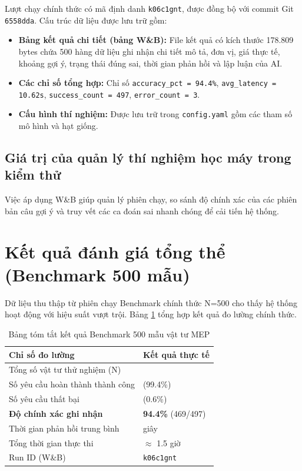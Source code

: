 Lượt chạy chính thức có mã định danh \texttt{k06c1gnt}, được đồng bộ với commit Git \texttt{6558dda}. Cấu trúc dữ liệu được lưu trữ gồm:

\begin{itemize}
    \item \textbf{Bảng kết quả chi tiết (bảng W\&B):} File kết quả có kích thước 178.809 bytes chứa 500 hàng dữ liệu ghi nhận chi tiết mô tả, đơn vị, giá thực tế, khoảng gợi ý, trạng thái đúng sai, thời gian phản hồi và lập luận của AI.
    \item \textbf{Các chỉ số tổng hợp:} Chỉ số \texttt{accuracy\_pct = 94.4\%}, \texttt{avg\_latency = 10.62s}, \texttt{success\_count = 497}, \texttt{error\_count = 3}.
    \item \textbf{Cấu hình thí nghiệm:} Được lưu trữ trong \texttt{config.yaml} gồm các tham số mô hình và hạt giống.
\end{itemize}

\subsection{Giá trị của quản lý thí nghiệm học máy trong kiểm thử}

Việc áp dụng W\&B giúp quản lý phiên chạy, so sánh độ chính xác của các phiên bản câu gợi ý và truy vết các ca đoán sai nhanh chóng để cải tiến hệ thống.

\section{Kết quả đánh giá tổng thể (Benchmark 500 mẫu)}

Dữ liệu thu thập từ phiên chạy Benchmark chính thức N=500 cho thấy hệ thống hoạt động với hiệu suất vượt trội. Bảng \ref{tab:benchmark_results} tổng hợp kết quả đo lường chính thức.

\begin{table}[H]
    \centering
    \caption{Bảng tóm tắt kết quả Benchmark 500 mẫu vật tư MEP}
    \begin{tabular}{|>{\raggedright\arraybackslash}p{7cm}|>{\centering\arraybackslash}p{5cm}|}
        \hline
        \textbf{Chỉ số đo lường} & \textbf{Kết quả thực tế} \\
        \hline
        Tổng số vật tư thử nghiệm (N) & 500 \\
        \hline
        Số yêu cầu hoàn thành thành công & 497 (99.4\%) \\
        \hline
        Số yêu cầu thất bại & 3 (0.6\%) \\
        \hline
        \textbf{Độ chính xác ghi nhận} & \textbf{94.4\%} (469/497) \\
        \hline
        Thời gian phản hồi trung bình & 10.62 giây \\
        \hline
        Tổng thời gian thực thi & $\approx$ 1.5 giờ \\
        \hline
        Run ID (W\&B) & \texttt{k06c1gnt} \\
        \hline
    \end{tabular}
    \label{tab:benchmark_results}
\end{table}

